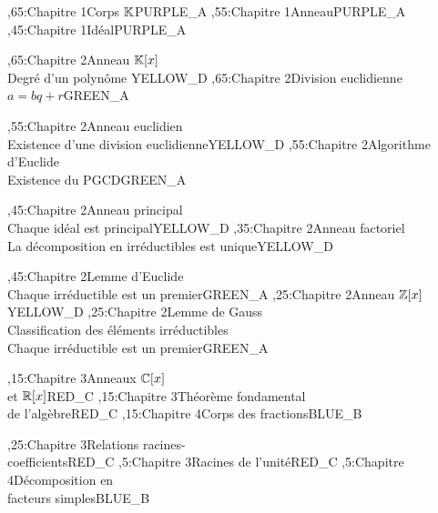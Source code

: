 


%
	\begin{chart}
	,65:{Chapitre 1}{Corps $\mathbb{K}$}{}{PURPLE_A}
	,55:{Chapitre 1}{Anneau}{}{PURPLE_A}
	,45:{Chapitre 1}{Idéal}{}{PURPLE_A}
	
	,65:{Chapitre 2}{Anneau $\mathbb{\mathbb{K}}[x]$ \\ {\tiny Degré d'un polynôme} }{}{YELLOW_D}
	,65:{Chapitre 2}{Division euclidienne \\ {\tiny $a = bq + r$}}{}{GREEN_A}
	
	,55:{Chapitre 2}{Anneau euclidien \\ {\tiny Existence d'une division euclidienne}}{}{YELLOW_D}
	,55:{Chapitre 2}{Algorithme d'Euclide \\ {\tiny Existence du PGCD}}{}{GREEN_A}
	
	,45:{Chapitre 2}{Anneau principal \\ {\tiny Chaque idéal est principal}}{}{YELLOW_D}
	,35:{Chapitre 2}{Anneau factoriel \\ {\tiny La décomposition en irréductibles est unique}}{}{YELLOW_D}
	
	,45:{Chapitre 2}{Lemme d'Euclide \\ {\tiny Chaque irréductible est un premier}}{}{GREEN_A}
	,25:{Chapitre 2}{Anneau $\mathbb{Z}[x]$}{}{YELLOW_D}
	,25:{Chapitre 2}{Lemme de Gauss \\ {\tiny Classification des éléments irréductibles}\\ {\tiny Chaque irréductible est un premier}}{}{GREEN_A}
	
	,15:{Chapitre 3}{Anneaux $\mathbb{C}[x]$ \\ et $\mathbb{R}[x]$}{}{RED_C}
	,15:{Chapitre 3}{Théorème fondamental \\ de l'algèbre}{}{RED_C}
	,15:{Chapitre 4}{Corps des fractions}{}{BLUE_B}
	
	,25:{Chapitre 3}{Relations racines- \\ coefficients}{}{RED_C}
	,5:{Chapitre 3}{Racines de l'unité}{}{RED_C}
	,5:{Chapitre 4}{Décomposition en \\ facteurs simples}{}{BLUE_B}
	

\end{chart}
